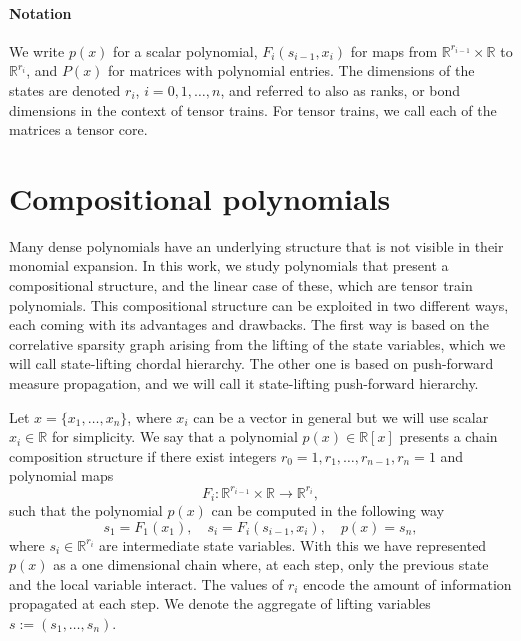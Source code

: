 \documentclass[11pt,a4paper]{article}
\newcommand{\R}{\mathbb R}
\theoremstyle{definition}
\begin{document}
\paragraph{Notation}

We write $p(x)$ for a scalar polynomial, $F_i(s_{i-1},x_i)$ for maps from $\R^{r_{i-1}}\times\R$ to $\R^{r_{i}}$, and $P(x)$ for matrices with polynomial entries. The dimensions of the states are denoted $r_i$, $i=0,1,\ldots,n$, and referred to also as ranks, or bond dimensions in the context of tensor trains. For tensor trains, we call each of the matrices a tensor core.



\section{Compositional polynomials}\label{sec:ttcomp}

Many dense polynomials have an underlying structure that is not visible in their monomial expansion. In this work, we study polynomials that present a compositional structure, and the linear case of these, which are tensor train polynomials. This compositional structure can be exploited in two different ways, each coming with its advantages and drawbacks. The first way is based on the correlative sparsity graph arising from the lifting of the state variables, which we will call state-lifting chordal hierarchy. The other one is based on push-forward measure propagation, and we will call it state-lifting push-forward hierarchy. 

Let $x=\{x_1,\dots,x_n\}$, where $x_i$ can be a vector in general but we will use scalar $x_i \in \R$ for simplicity. We say that a polynomial $p(x)\in \R[x]$ presents a chain composition structure if there exist integers $r_0=1,r_1,\dots,r_{n-1},r_n=1$ and polynomial maps
\[
F_i:\R^{r_{i-1}}\times \R \rightarrow \R^{r_i},
\]
such that the polynomial $p(x)$ can be computed in the following way
\begin{equation}\label{eq:themodel}
    s_1 =F_1(x_1), \quad
    s_i  = F_i(s_{i-1},x_i), \quad
    p(x)=s_n,
\end{equation}
where $s_i\in \R^{r_i}$ are intermediate state variables. With this we have represented $p(x)$ as a one dimensional chain where, at each step, only the previous state and the local variable interact. The values of $r_i$ encode the amount of information propagated at each step. We denote the aggregate of lifting variables $s := (s_1,\ldots,s_n)$.
\end{document}
